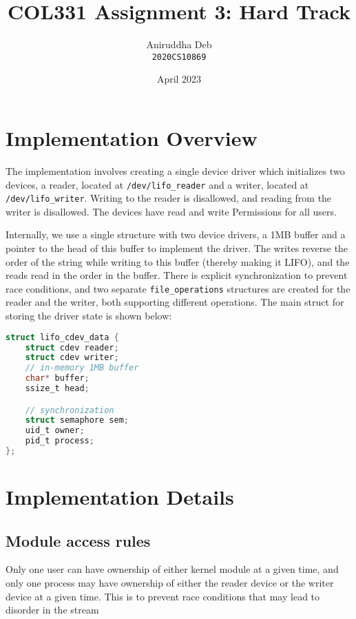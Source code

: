 \documentclass[12pt]{article}
\title{\textbf{COL331 Assignment 3: Hard Track}}
\author{Aniruddha Deb \\ \texttt{2020CS10869}}
\date{April 2023}
\begin{document}
\maketitle

\section{Implementation Overview}

The implementation involves creating a single device driver which initializes 
two devices, a reader, located at \texttt{/dev/lifo\_reader} and a writer, 
located at \texttt{/dev/lifo\_writer}. Writing to the reader is disallowed, and
reading from the writer is disallowed. The devices have read and write Permissions 
for all users. 

Internally, we use a single structure with two device drivers, a 1MB buffer and
a pointer to the head of this buffer to implement the driver. The writes reverse
the order of the string while writing to this buffer (thereby making it LIFO),
and the reads read in the order in the buffer. There is explicit synchronization
to prevent race conditions, and two separate \texttt{file\_operations} structures
are created for the reader and the writer, both supporting different operations.
The main struct for storing the driver state is shown below:

\begin{lstlisting}[language=C]
struct lifo_cdev_data {
	struct cdev reader;
	struct cdev writer;
	// in-memory 1MB buffer
	char* buffer;
	ssize_t head;

	// synchronization
	struct semaphore sem;
	uid_t owner;
	pid_t process;
};
\end{lstlisting}

\section{Implementation Details}

\subsection{Module access rules}

Only one user can have ownership of either kernel module at a given time, and 
only one process may have ownership of either the reader device or the writer
device at a given time. This is to prevent race conditions that may lead to
disorder in the stream
\end{document}
